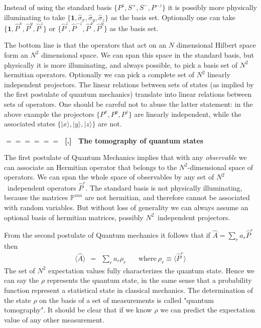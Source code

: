 \documentclass[onecolumn,fleqn]{revtex4}
\newcommand{\beq}{\begin{eqnarray}}
\newcommand{\eeq}{\end{eqnarray}}
\renewcommand{\thesubsection}{\arabic{subsection}}
\renewcommand{\thesubsubsection}{\arabic{subsubsection}}
\newcommand{\sheadC}[1]
{
\addtocounter{subsubsection}{1}
\vspace{5mm}
{\Large\bf $=\!=\!=\!=\!=\!=\;$ [\thesubsection.\thesubsubsection] \ #1}  
\nopagebreak
\phantomsection
}
\begin{document}
Instead of using the standard basis ${ \{P^{z},S^{+},S^{-},P^{-z}\} }$  
it is possibly more physically illuminating  
to take ${\{\bm{1},\hat{\sigma}_x, \hat{\sigma}_y, \hat{\sigma}_z\}}$ as the basis set. 
Optionally one can take ${\{\bm{1},\hat{P}^x, \hat{P}^y, \hat{P}^z\}}$ 
or ${ \{ \hat{P}^z, \hat{P}^{-z} ,\hat{P}^x, \hat{P}^y \}}$ as the basis set. 

The bottom line is that the operators that act on an $N$ dimensional Hilbert space  
form an $N^2$ dimensional space. We can span this space in the standard basis, 
but physically it is more illuminating, and always possible, to pick a basis set of $N^2$ hermitian operators. 
Optionally we can pick a complete set of $N^2$ linearly independent projectors. 
The linear relations between sets of states (as implied by the first postulate of quantum mechanics)   
translate into linear relations between sets of operators.
One should be careful not to abuse the latter statement: 
in the above example the projectors ${ \{ P^x, P^y, P^z \} }$ are linearly independent, 
while the associated states ${ \{ |x\rangle, |y\rangle, |z\rangle \} }$ are not. 



\sheadC{The tomography of quantum states}

The first postulate of Quantum Mechanics implies that 
with any {\em observable} we can associate an Hermitian 
operator that belongs to the $N^2$-dimensional space of operators.
We can span the whole space of observables 
by any set of $N^2$~independent operators $\hat{P}^r$. 
The standard basis is not physically illuminating,  
because the matrices $\mathbb{P}^{mn}$ are not hermitian, 
and therefore cannot be associated with random variables. 
But without loss of generality we can 
always assume an optional basis of hermitian matrices, 
possibly $N^2$~independent projectors. 

From the second postulate of Quantum mechanics 
it follows that if ${\hat{A}=\sum_r a_r \hat{P}^r}$ then 
\beq
\langle\hat{A}\rangle \ \ = \ \ \sum_r a_r \rho_r  
\ \ \ \ \ \ \ \ \mbox{where} \ \rho_r \equiv \langle\hat{P}^r\rangle
\eeq
The set of $N^2$ expectation values fully characterizes the quantum state. 
Hence we can say the $\rho$ represents the quantum state, 
in the same sense that a probability function represent 
a statistical state in classical mechanics.  
The determination of the state $\rho$ on the basis of a set 
of measurements is called "quantum tomography".
It should be clear that if we know $\rho$ we can predict the 
expectation value of any other measurement. 
\end{document}
